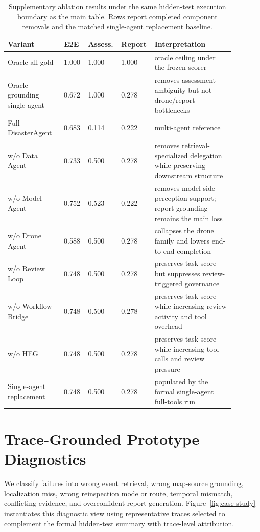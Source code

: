 \documentclass{article}
\begin{document}
\begin{table}[ht]
    \centering
    \small
    \setlength{\tabcolsep}{4pt}
    \caption{Supplementary ablation results under the same hidden-test execution boundary as the main table. Rows report completed component removals and the matched single-agent replacement baseline.}
    \label{tab:ablation}
    \begin{tabular}{L{0.24\linewidth}C{0.10\linewidth}C{0.10\linewidth}C{0.10\linewidth}L{0.34\linewidth}}
        \toprule
        Variant & E2E & Assess. & Report & Interpretation \\
        \midrule
        Oracle all gold & 1.000 & 1.000 & 1.000 & oracle ceiling under the frozen scorer \\
        Oracle grounding single-agent & 0.672 & 1.000 & 0.278 & removes assessment ambiguity but not drone/report bottlenecks \\
        Full DisasterAgent & 0.683 & 0.114 & 0.222 & multi-agent reference \\
        w/o Data Agent & 0.733 & 0.500 & 0.278 & removes retrieval-specialized delegation while preserving downstream structure \\
        w/o Model Agent & 0.752 & 0.523 & 0.222 & removes model-side perception support; report grounding remains the main loss \\
        w/o Drone Agent & 0.588 & 0.500 & 0.278 & collapses the drone family and lowers end-to-end completion \\
        w/o Review Loop & 0.748 & 0.500 & 0.278 & preserves task score but suppresses review-triggered governance \\
        w/o Workflow Bridge & 0.748 & 0.500 & 0.278 & preserves task score while increasing review activity and tool overhead \\
        w/o HEG & 0.748 & 0.500 & 0.278 & preserves task score while increasing tool calls and review pressure \\
        Single-agent replacement & 0.748 & 0.500 & 0.278 & populated by the formal single-agent full-tools run \\
        \bottomrule
    \end{tabular}
\end{table}

\section{Trace-Grounded Prototype Diagnostics}

We classify failures into wrong event retrieval, wrong map-source grounding, localization miss, wrong reinspection mode or route, temporal mismatch, conflicting evidence, and overconfident report generation. Figure~\ref{fig:case-study} instantiates this diagnostic view using representative traces selected to complement the formal hidden-test summary with trace-level attribution.
\end{document}
